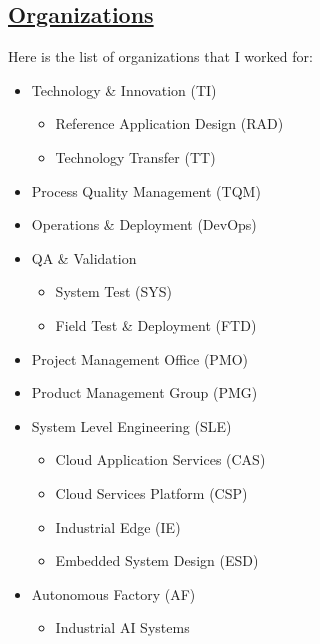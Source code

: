\documentclass[]{cv-class}
\begin{document}
\begin{aside}
    \section{ \underline{Organizations}}
    Here is the list of organizations that I worked for: \\
{\small \begin{itemize}
    \item Technology \& Innovation (TI)
    \begin{itemize}
             \item Reference Application Design (RAD)
    \item Technology Transfer (TT)
    \end{itemize}
    \item Process Quality Management  (TQM)
        \item   Operations \& Deployment (DevOps) 
     \item QA \& Validation \begin{itemize}
     \item System Test  (SYS)
          \item Field Test \& Deployment (FTD)
     \end{itemize}
     \item Project Management Office (PMO)
     \item Product Management Group (PMG)
     \item System Level Engineering (SLE)
     \begin{itemize}
         \item Cloud Application Services (CAS)
         \item Cloud Services Platform (CSP)
         \item Industrial Edge (IE)
         \item Embedded System Design (ESD)  
    \end{itemize}
     \item Autonomous Factory (AF)
     \begin{itemize}
          \item Industrial AI Systems 
     \end{itemize}
     
\end{itemize}
}
\end{aside}                     
\end{document}
